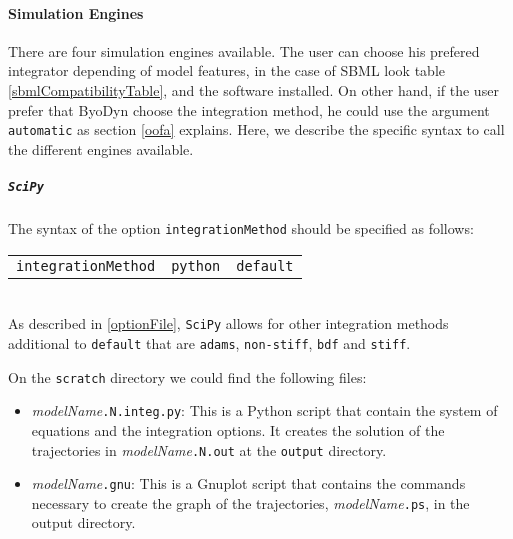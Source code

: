 \documentclass[a4paper, 11pt]{article}
\begin{document}
\paragraph{Simulation Engines}
There are four simulation engines available. The user can choose his prefered
integrator depending of model features, in the case of SBML look table
\ref{sbmlCompatibilityTable}, and the software installed. On other hand, if the user prefer that ByoDyn choose the integration method, he could use the argument
\texttt{automatic} as section \ref{oofa} explains. Here, we describe the
specific syntax to call the different engines available.
\subparagraph{\texttt{SciPy}}
The syntax of the option \texttt{integrationMethod} should be specified as follows:\\[1.5ex]
\begin{tabular}{ccc}\texttt{integrationMethod}&\texttt{python}&\texttt{default}\end{tabular}\\[1.5ex]
As described in \ref{optionFile}, \texttt{SciPy} allows for other integration methods additional to \texttt{default} that are \texttt{adams}, \texttt{non-stiff}, \texttt{bdf} and \texttt{stiff}. 

On the \texttt{scratch} directory  we could find the following files:
\begin{itemize}
\item \textit{modelName}\texttt{.N.integ.py}:
  This is a Python script that contain the system of equations and the integration options.
  It creates the solution of the trajectories in \textit{modelName}\texttt{.N.out} at the \texttt{output} directory.
\item \textit{modelName}\texttt{.gnu}:
  This is a Gnuplot script that contains the commands necessary to create the graph of the trajectories, \textit{modelName}\texttt{.ps}, in the output directory.
\end{itemize}
\end{document}

